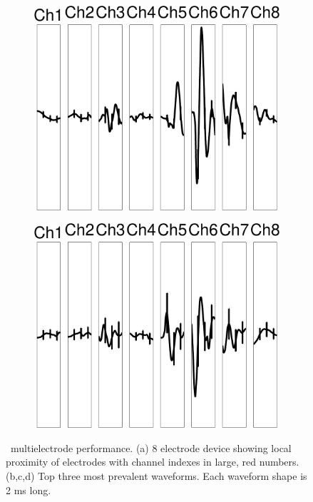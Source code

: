 \begin{center}
\begin{figure}
\begin{subfigure}[b]{.28\textwidth}
\includegraphics[width=\textwidth]{../figs/8devim/clus9}
\caption{}
\label{ex82}
\end{subfigure}
\begin{subfigure}[b]{.28\textwidth}
\includegraphics[width=\textwidth]{../figs/8devim/clus6}
\caption{}
\label{ex83}
\end{subfigure}
\caption{
\smug\ multielectrode performance.
(a) 8 electrode device showing local proximity of electrodes with channel indexes in large, red numbers. (b,c,d) Top three most prevalent waveforms.  Each waveform shape is 2 ms long.
} \label{sfig:8}
\end{figure}
\end{center}



